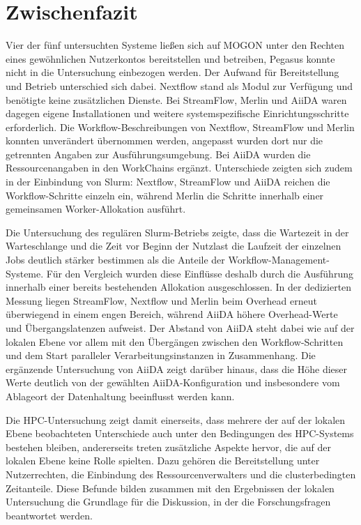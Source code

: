 \section{Zwischenfazit}
\label{sec:mogon:zwischenfazit}

Vier der fünf untersuchten Systeme ließen sich auf MOGON unter den
Rechten eines gewöhnlichen Nutzerkontos bereitstellen und
betreiben, Pegasus konnte nicht in die Untersuchung einbezogen
werden. Der Aufwand für Bereitstellung und Betrieb unterschied sich dabei.
Nextflow stand als Modul zur Verfügung und benötigte keine
zusätzlichen Dienste. Bei StreamFlow, Merlin und AiiDA waren
dagegen eigene Installationen und weitere systemspezifische
Einrichtungsschritte erforderlich. Die Workflow-Beschreibungen von Nextflow, StreamFlow und Merlin konnten unverändert übernommen werden, angepasst wurden dort nur die getrennten Angaben zur Ausführungsumgebung. Bei AiiDA wurden
die Ressourcenangaben in den WorkChains ergänzt.
Unterschiede zeigten sich zudem in der Einbindung von Slurm: Nextflow, StreamFlow und AiiDA reichen die Workflow-Schritte einzeln ein, während Merlin die Schritte innerhalb einer gemeinsamen Worker-Allokation ausführt.

Die Untersuchung des regulären Slurm-Betriebs zeigte, dass die
Wartezeit in der Warteschlange und die Zeit vor Beginn der Nutzlast
die Laufzeit der einzelnen Jobs deutlich stärker bestimmen als die
Anteile der Workflow-Management-Systeme. Für den Vergleich wurden
diese Einflüsse deshalb durch die Ausführung innerhalb einer
bereits bestehenden Allokation ausgeschlossen. In der dedizierten
Messung liegen StreamFlow, Nextflow und Merlin beim Overhead erneut
überwiegend in einem engen Bereich, während AiiDA höhere
Overhead-Werte und Übergangslatenzen aufweist. Der Abstand von
AiiDA steht dabei wie auf der lokalen Ebene vor allem mit den
Übergängen zwischen den Workflow-Schritten und dem Start paralleler
Verarbeitungsinstanzen in Zusammenhang. Die ergänzende Untersuchung
von AiiDA zeigt darüber hinaus, dass die Höhe dieser Werte deutlich
von der gewählten AiiDA-Konfiguration und insbesondere vom
Ablageort der Datenhaltung beeinflusst werden kann.

Die HPC-Untersuchung zeigt damit einerseits, dass mehrere der auf
der lokalen Ebene beobachteten Unterschiede auch unter den
Bedingungen des HPC-Systems bestehen bleiben, andererseits treten
zusätzliche Aspekte hervor, die auf der lokalen Ebene keine Rolle
spielten. Dazu gehören die Bereitstellung unter Nutzerrechten, die
Einbindung des Ressourcenverwalters und die clusterbedingten
Zeitanteile. Diese Befunde bilden zusammen mit den Ergebnissen der
lokalen Untersuchung die Grundlage für die Diskussion, in der die Forschungsfragen beantwortet werden.